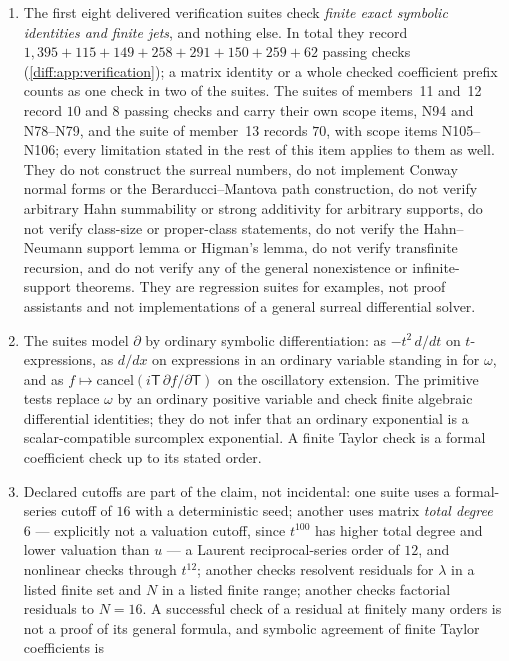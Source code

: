 \documentclass[11pt,letterpaper]{article}
\numberwithin{equation}{section}
\theoremstyle{definition}
\theoremstyle{remark}
\newcommand{\der}{\partial}
\begin{document}
\begin{enumerate}[label=\textup{N\arabic*.},leftmargin=3.0em,itemsep=0.35em,start=48]
\item The first eight delivered verification suites check \emph{finite exact
symbolic identities and finite jets}, and nothing else. In total they record
$1{,}395+115+149+258+291+150+259+62$ passing checks
(\cref{diff:app:verification}); a matrix identity or a whole checked
coefficient prefix counts as one check in two of the suites. The suites of
members~11 and~12 record $10$ and $8$ passing checks and carry their own scope
items, N94 and N78--N79, and the suite of member~13 records $70$, with scope
items N105--N106; every limitation stated in the rest of this item applies
to them as well. They do not
construct the surreal numbers, do not implement Conway normal forms or the
Berarducci--Mantova path construction, do not verify arbitrary Hahn
summability or strong additivity for arbitrary supports, do not verify
class-size or proper-class statements, do not verify the Hahn--Neumann support
lemma or Higman's lemma, do not verify transfinite recursion, and do not
verify any of the general nonexistence or infinite-support theorems. They are
regression suites for examples, not proof assistants and not implementations
of a general surreal differential solver.
\item The suites model $\der$ by ordinary symbolic differentiation: as
$-t^{2}\,d/dt$ on $t$-expressions, as $d/dx$ on expressions in an ordinary
variable standing in for $\omega$, and as $f\mapsto\mathrm{cancel}(i\mathsf T\,
\partial f/\partial\mathsf T)$ on the oscillatory extension. The primitive
tests replace $\omega$ by an ordinary positive variable and check finite
algebraic differential identities; they do not infer that an ordinary
exponential is a scalar-compatible surcomplex exponential. A finite Taylor
check is a formal coefficient check up to its stated order.
\item Declared cutoffs are part of the claim, not incidental: one suite uses a
formal-series cutoff of $16$ with a deterministic seed; another uses matrix
\emph{total degree} $6$ --- explicitly not a valuation cutoff, since
$t^{100}$ has higher total degree and lower valuation than $u$ --- a Laurent
reciprocal-series order of $12$, and nonlinear checks through $t^{12}$;
another checks resolvent residuals for $\lambda$ in a listed finite set and
$N$ in a listed finite range; another checks factorial residuals to
$N=16$. A successful check of a residual at finitely many orders is not a proof
of its general formula, and symbolic agreement of finite Taylor coefficients is

\end{enumerate}
\end{document}
